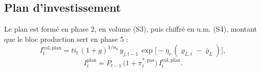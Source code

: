 \documentclass[11pt,a4paper]{article}
\begin{document}
\subsection{Plan d'investissement}
\label{sec:investissement-plan}
\begin{proposee}
Le plan est formé en phase 2, en volume (S3), puis chiffré en u.m. (S4), montant que le bloc production sert en phase 5 :
\begin{equation*}
I^{\mathrm{vol},\mathrm{plan}}_t = \mathit{ti}_t\,(1 + g)^{1/n_a}\, y_{j,t-1}\, \exp\bigl[-\eta_r\,(\varrho_{L,t} - \bar\varrho_L)\bigr], \tag{S3}
\end{equation*}
\begin{equation*}
I^{\mathrm{plan}}_t = P_{t-1}\,\bigl(1 + \pi^{\ast,\mathrm{pas}}_t\bigr)\, I^{\mathrm{vol},\mathrm{plan}}_t . \tag{S4}
\end{equation*}


\end{proposee}
\end{document}
